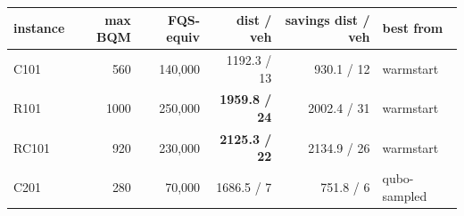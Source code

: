 \begin{tabular}{lrrrrl}
\toprule
instance & max BQM & FQS-equiv & dist / veh & savings dist / veh & best from \\
\midrule
C101 & 560 & 140,000 & 1192.3 / 13 & 930.1 / 12 & warmstart \\
R101 & 1000 & 250,000 & \textbf{1959.8 / 24} & 2002.4 / 31 & warmstart \\
RC101 & 920 & 230,000 & \textbf{2125.3 / 22} & 2134.9 / 26 & warmstart \\
C201 & 280 & 70,000 & 1686.5 / 7 & 751.8 / 6 & qubo-sampled \\
\bottomrule
\end{tabular}
